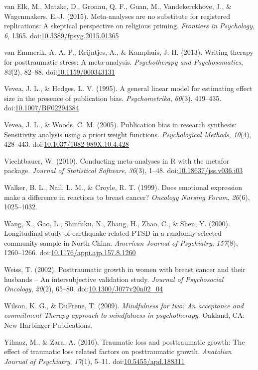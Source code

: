 \documentclass[man, mask]{apa6}
\theoremstyle{definition}
\theoremstyle{definition}
\theoremstyle{definition}
\theoremstyle{remark}
\begin{document}
\hypertarget{ref-VanElk2015}{}
van Elk, M., Matzke, D., Gronau, Q. F., Guan, M., Vandekerckhove, J., \&
Wagenmakers, E.-J. (2015). Meta-analyses are no substitute for
registered replications: A skeptical perspective on religious priming.
\emph{Frontiers in Psychology}, \emph{6}, 1365.
doi:\href{https://doi.org/10.3389/fpsyg.2015.01365}{10.3389/fpsyg.2015.01365}

\hypertarget{ref-VanEmmerik2013}{}
van Emmerik, A. A. P., Reijntjes, A., \& Kamphuis, J. H. (2013). Writing
therapy for posttraumatic stress: A meta-analysis. \emph{Psychotherapy
and Psychosomatics}, \emph{82}(2), 82--88.
doi:\href{https://doi.org/10.1159/000343131}{10.1159/000343131}

\hypertarget{ref-Vevea1995}{}
Vevea, J. L., \& Hedges, L. V. (1995). A general linear model for
estimating effect size in the presence of publication bias.
\emph{Psychometrika}, \emph{60}(3), 419--435.
doi:\href{https://doi.org/10.1007/BF02294384}{10.1007/BF02294384}

\hypertarget{ref-Vevea2005}{}
Vevea, J. L., \& Woods, C. M. (2005). Publication bias in research
synthesis: Sensitivity analysis using a priori weight functions.
\emph{Psychological Methods}, \emph{10}(4), 428--443.
doi:\href{https://doi.org/10.1037/1082-989X.10.4.428}{10.1037/1082-989X.10.4.428}

\hypertarget{ref-Viechtbauer2010}{}
Viechtbauer, W. (2010). Conducting meta-analyses in R with the metafor
package. \emph{Journal of Statistical Software}, \emph{36}(3), 1--48.
doi:\href{https://doi.org/10.18637/jss.v036.i03}{10.18637/jss.v036.i03}

\hypertarget{ref-Walker1999a}{}
Walker, B. L., Nail, L. M., \& Croyle, R. T. (1999). Does emotional
expression make a difference in reactions to breast cancer?
\emph{Oncology Nursing Forum}, \emph{26}(6), 1025--1032.

\hypertarget{ref-Wang2000}{}
Wang, X., Gao, L., Shinfuku, N., Zhang, H., Zhao, C., \& Shen, Y.
(2000). Longitudinal study of earthquake-related PTSD in a randomly
selected community sample in North China. \emph{American Journal of
Psychiatry}, \emph{157}(8), 1260--1266.
doi:\href{https://doi.org/10.1176/appi.ajp.157.8.1260}{10.1176/appi.ajp.157.8.1260}

\hypertarget{ref-Weiss2002}{}
Weiss, T. (2002). Posttraumatic growth in women with breast cancer and
their husbands -- An intersubjective validation study. \emph{Journal of
Psychosocial Oncology}, \emph{20}(2), 65--80.
doi:\href{https://doi.org/10.1300/J077v20n02_04}{10.1300/J077v20n02\_04}

\hypertarget{ref-Wilson2009}{}
Wilson, K. G., \& DuFrene, T. (2009). \emph{Mindfulness for two: An
acceptance and commitment Therapy approach to mindfulness in
psychotherapy}. Oakland, CA: New Harbinger Publications.

\hypertarget{ref-Yilmaz2016}{}
Yilmaz, M., \& Zara, A. (2016). Traumatic loss and posttraumatic growth:
The effect of traumatic loss related factors on posttraumatic growth.
\emph{Anatolian Journal of Psychiatry}, \emph{17}(1), 5--11.
doi:\href{https://doi.org/10.5455/apd.188311}{10.5455/apd.188311}
\end{document}
